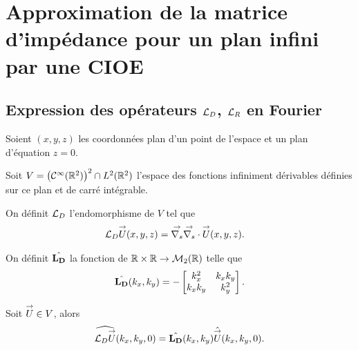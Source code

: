\section{Approximation de la matrice d'impédance pour un plan infini par une CIOE}

  \subsection[Expression des opérateurs LD, LR en Fourier]{Expression des opérateurs \({\mathcal{L}_D}\), \({\mathcal{L}_R}\) en Fourier}
    \label{sec:plan:hoibc:LD-LR}
    Soient \((x,y,z)\) les coordonnées plan d'un point de l'espace et un plan d'équation \(z=0\).

    Soit \(V = \left(\mathcal{C}^\infty(\mathbb R^2)\right)^2 \cap L^2(\mathbb R^2)\) l'espace des fonctions infiniment dérivables définies sur ce plan et de carré intégrable.

    \begin{defn}
      \label{eq:plan:fourier:LD}
      On définit \({\mathcal{L}_D}\) l'endomorphisme de \(V\) tel que
      \begin{align*}
        {\mathcal{L}_D} {\overset{\rightarrow}{U}}(x,y,z) & = {\overset{\rightarrow}{\nabla_s}}{} {\overset{\rightarrow}{\nabla_s}} \cdot{} {\overset{\rightarrow}{U}}(x,y,z).
      \end{align*}

      On définit \(\hat{\mathbf{L_D}}\) la fonction de \(\mathbb R\times\mathbb R \rightarrow \mathcal{M}_2(\mathbb R)\) telle que
      \begin{equation*}
        \hat{\mathbf{L_D}}(k_x,k_y) = -
        \begin{bmatrix}
          k_x^2 & k_xk_y
          \\
          k_xk_y & k_y^2
        \end{bmatrix}.
      \end{equation*}
    \end{defn}

    \begin{prop}
      Soit \({\overset{\rightarrow}{U}} \in V\), alors
      \begin{equation*}
        \widehat{{\mathcal{L}_D} {\overset{\rightarrow}{U}}} (k_x,k_y,0) = \hat{\mathbf{L_D}}(k_x,k_y) \hat{{\overset{\rightarrow}{U}}}(k_x,k_y,0).
      \end{equation*}
    \end{prop}

